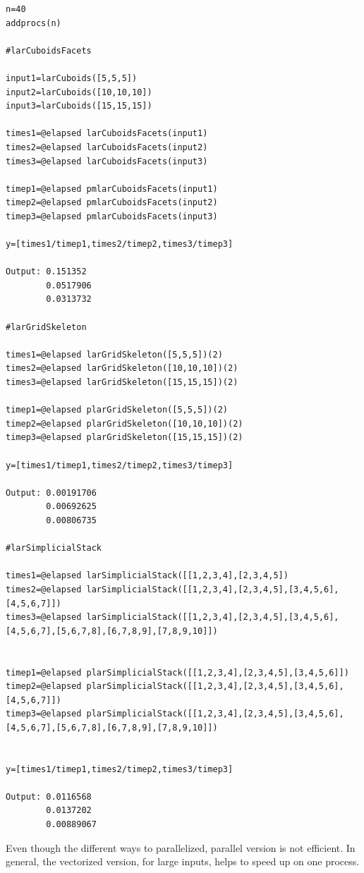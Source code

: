 \documentclass{article}
\begin{document}
\begin{flushleft}\small
\begin{list}{}{} \item
  \begin{Verbatim}[tabsize=4]
n=40
addprocs(n)

#larCuboidsFacets

input1=larCuboids([5,5,5])
input2=larCuboids([10,10,10])
input3=larCuboids([15,15,15])

times1=@elapsed larCuboidsFacets(input1)
times2=@elapsed larCuboidsFacets(input2)
times3=@elapsed larCuboidsFacets(input3)

timep1=@elapsed pmlarCuboidsFacets(input1)
timep2=@elapsed pmlarCuboidsFacets(input2)
timep3=@elapsed pmlarCuboidsFacets(input3)

y=[times1/timep1,times2/timep2,times3/timep3]

Output: 0.151352
        0.0517906
        0.0313732

#larGridSkeleton

times1=@elapsed larGridSkeleton([5,5,5])(2)
times2=@elapsed larGridSkeleton([10,10,10])(2)
times3=@elapsed larGridSkeleton([15,15,15])(2)

timep1=@elapsed plarGridSkeleton([5,5,5])(2)
timep2=@elapsed plarGridSkeleton([10,10,10])(2)
timep3=@elapsed plarGridSkeleton([15,15,15])(2)

y=[times1/timep1,times2/timep2,times3/timep3]

Output: 0.00191706
        0.00692625
        0.00806735

#larSimplicialStack

times1=@elapsed larSimplicialStack([[1,2,3,4],[2,3,4,5])
times2=@elapsed larSimplicialStack([[1,2,3,4],[2,3,4,5],[3,4,5,6],[4,5,6,7]])
times3=@elapsed larSimplicialStack([[1,2,3,4],[2,3,4,5],[3,4,5,6],[4,5,6,7],[5,6,7,8],[6,7,8,9],[7,8,9,10]])


timep1=@elapsed plarSimplicialStack([[1,2,3,4],[2,3,4,5],[3,4,5,6]])
timep2=@elapsed plarSimplicialStack([[1,2,3,4],[2,3,4,5],[3,4,5,6],[4,5,6,7]])
timep3=@elapsed plarSimplicialStack([[1,2,3,4],[2,3,4,5],[3,4,5,6],[4,5,6,7],[5,6,7,8],[6,7,8,9],[7,8,9,10]])


y=[times1/timep1,times2/timep2,times3/timep3]

Output: 0.0116568
        0.0137202   
        0.00889067
\end{Verbatim}
\end{list}
\end{flushleft}   
\vspace{2ex}
Even though the different ways to parallelized, parallel version is not efficient.  
In general, the vectorized version, for large inputs, helps to speed up on one process.



\end{document}
